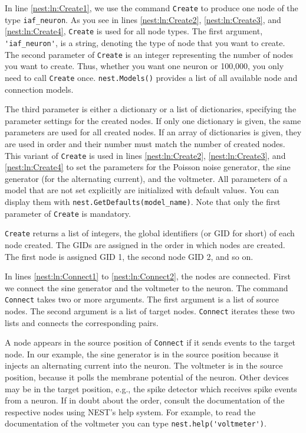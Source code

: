 \documentclass{article}
\begin{document}
In line \ref{nest:ln:Create1}, we use the command \lstinline!Create!
to produce one node of the type \lstinline!iaf_neuron!. As you see in
lines \ref{nest:ln:Create2}, \ref{nest:ln:Create3}, and
\ref{nest:ln:Create4}, \lstinline!Create! is used for all node types.
The first argument, \lstinline!'iaf_neuron'!, is a string, denoting
the type of node that you want to create.
The second parameter of \lstinline!Create! is an integer representing
the number of nodes you want to create. Thus, whether you want one neuron
or 100,000, you only need to call \lstinline!Create! once.
\lstinline!nest.Models()! provides a list of all available node and
connection models.

The third parameter is either a dictionary or a list of dictionaries,
specifying the parameter settings for the created nodes. If only one
dictionary is given, the same parameters are used for all created
nodes. If an array of dictionaries is given, they are used in order
and their number must match the number of created nodes. This variant
of \lstinline!Create! is used in lines \ref{nest:ln:Create2},
\ref{nest:ln:Create3}, and \ref{nest:ln:Create4} to set the parameters
for the Poisson noise generator, the sine generator (for the
alternating current), and the voltmeter. All parameters of a model
that are not set explicitly are initialized with default values. You
can display them with
{  %
\lstinline!nest.GetDefaults(model_name)!}.
Note that only the first
parameter of \lstinline!Create! is mandatory. 

\lstinline!Create! returns a list of integers, the  global
identifiers (or GID for short)
 of each node created. The GIDs are
assigned in the order in which nodes are created. The first node is
assigned GID 1, the second node GID 2, and so on.

In lines \ref{nest:ln:Connect1} to \ref{nest:ln:Connect2}, the nodes
are connected. First we connect the sine generator and the voltmeter
to the neuron. The command  \lstinline!Connect! takes two or more
arguments. The first argument is a list of source nodes. The second
argument is a list of target nodes. \lstinline!Connect! iterates these
two lists and connects the corresponding pairs.

A node appears in the source position of \lstinline!Connect! if it sends events
to the target node. In our example, the sine generator is in the
source position because it injects an alternating current into the
neuron. The voltmeter is in the source position, because it polls the
membrane potential of the neuron. Other devices may be in the target
position, e.g., the spike detector which receives spike events from a
neuron. If in doubt about the order, consult the documentation of the
respective nodes using NEST's help system. For example, to read the
documentation of the voltmeter you can type
\lstinline!nest.help('voltmeter')!.
\end{document}
